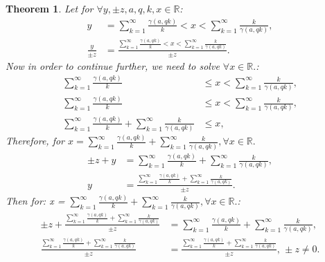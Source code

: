 \documentclass[10pt]{article}
\theoremstyle{plain}
\newtheorem{theorem}{Theorem}[section]
\theoremstyle{definition}
\theoremstyle{remark}
\begin{document}
\begin{theorem}
	Let for $\forall y, \pm z, a, q, k, x \in \mathbb{R}$:
	\begin{align*}
		y &= \sum_{k=1}^{\infty} \frac{\gamma(a, qk)}{k} < x < \sum_{k=1}^{\infty} \frac{k}{\gamma(a, qk)},\\
		\frac{y}{\pm z} &= \frac{\sum_{k=1}^{\infty} \frac{\gamma(a, qk)}{k} < x < \sum_{k=1}^{\infty} \frac{k}{\gamma(a, qk)}}{\pm z}.
	\end{align*}
	Now in order to continue further, we need to solve $\forall x \in \mathbb{R}.$:
	\begin{align*}
		\sum_{k=1}^{\infty} \frac{\gamma(a, qk)}{k} &\leq x < \sum_{k=1}^{\infty} \frac{k}{\gamma(a, qk)},\\
		\sum_{k=1}^{\infty} \frac{\gamma(a, qk)}{k} &\leq x < \sum_{k=1}^{\infty} \frac{k}{\gamma(a, qk)},\\
		\sum_{k=1}^{\infty} \frac{\gamma(a, qk)}{k} + \sum_{k=1}^{\infty} \frac{k}{\gamma(a, qk)} &\leq x,
	\end{align*}
	Therefore, for $x = \sum_{k=1}^{\infty} \frac{\gamma(a, qk)}{k} + \sum_{k=1}^{\infty} \frac{k}{\gamma(a, qk)}, \forall x \in \mathbb{R}.$
	\begin{align*}
		\pm z + y &= \sum_{k=1}^{\infty} \frac{\gamma(a, qk)}{k} + \sum_{k=1}^{\infty} \frac{k}{\gamma(a, qk)},\\
		y &= \frac{\sum_{k=1}^{\infty} \frac{\gamma(a, qk)}{k} + \sum_{k=1}^{\infty} \frac{k}{\gamma(a, qk)}}{\pm z}.
	\end{align*}
	Then for: x = $\sum_{k=1}^{\infty} \frac{\gamma(a, qk)}{k} + \sum_{k=1}^{\infty} \frac{k}{\gamma(a, qk)}, \forall x \in \mathbb{R}.$:
	\begin{align*}
		\pm z + \frac{\sum_{k=1}^{\infty} \frac{\gamma(a, qk)}{k} + \sum_{k=1}^{\infty}\frac{k}{\gamma(a, qk)}}{\pm z} &= \sum_{k=1}^{\infty} \frac{\gamma(a, qk)}{k} + \sum_{k=1}^{\infty}\frac{k}{\gamma(a, qk)},\\
		\frac{\sum_{k=1}^{\infty} \frac{\gamma(a, qk)}{k} + \sum_{k=1}^{\infty} \frac{k}{\gamma(a, qk)}}{\pm z} &= \frac{\sum_{k=1}^{\infty} \frac{\gamma(a, qk)}{k} + \sum_{k=1}^{\infty} \frac{k}{\gamma(a, qk)}}{\pm z}, \, \pm z \neq 0.
	\end{align*}
\end{theorem}
\end{document}

